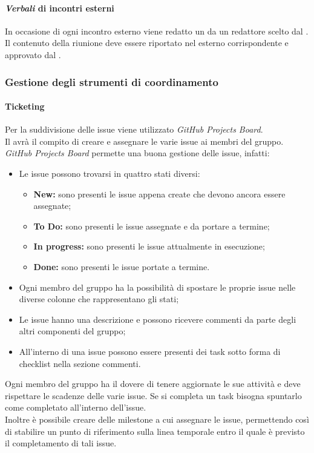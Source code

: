       \paragraph {\textit{Verbali} di incontri esterni}
      In occasione di ogni incontro esterno viene redatto un \docNameVLow{} da un redattore scelto dal \roleProjectManagerLow. Il contenuto della riunione deve essere riportato nel \docNameVLow{} esterno corrispondente e approvato dal \roleProjectManagerLow.

    \subsubsection{Gestione degli strumenti di coordinamento}
      \paragraph{Ticketing}
        Per la suddivisione delle issue\glo{} viene utilizzato \textit{GitHub Projects Board}\glo{}.\\
        Il \roleProjectManagerLow{} avrà il compito di creare e assegnare le varie issue\glo{} ai membri del gruppo.\\
        \textit{GitHub Projects Board}\glo{} permette una buona gestione delle issue\glo{}, infatti:
        \begin{itemize}
          \item Le issue\glo{} possono trovarsi in quattro stati diversi:
          \begin{itemize}
            \item \textbf{New:} sono presenti le issue\glo{} appena create che devono ancora essere assegnate;
            \item \textbf{To Do:} sono presenti le issue\glo{} assegnate e da portare a termine;
            \item \textbf{In progress:} sono presenti le issue\glo{} attualmente in esecuzione;
            \item \textbf{Done:} sono presenti le issue\glo{} portate a termine.
          \end{itemize}
          \item Ogni membro del gruppo ha la possibilità di spostare le proprie issue\glo{} nelle diverse colonne che rappresentano gli stati;
          \item Le issue\glo{} hanno una descrizione e possono ricevere commenti da parte degli altri componenti del gruppo;
          \item All'interno di una issue\glo{} possono essere presenti dei task sotto forma di checklist nella sezione commenti.
        \end{itemize}
        Ogni membro del gruppo ha il dovere di tenere aggiornate le sue attività e deve rispettare le scadenze delle varie issue\glo{}.
        Se si completa un task bisogna spuntarlo come completato all'interno dell'issue\glo{}.\\
        Inoltre è possibile creare delle milestone\glo{} a cui assegnare le issue\glo{}, permettendo così di stabilire un punto di
        riferimento sulla linea temporale entro il quale è previsto il completamento di tali issue\glo{}.

